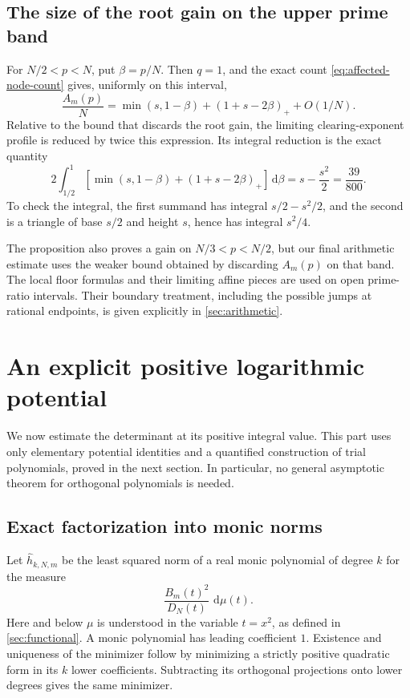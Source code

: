 \documentclass[11pt,letterpaper]{article}
\theoremstyle{definition}
\newcommand{\dd}{\,\mathrm d}
\newcommand{\pos}[1]{\left(#1\right)_{+}}
\begin{document}
\subsection{The size of the root gain on the upper prime band}
For $N/2<p<N$, put $\beta=p/N$. Then $q=1$, and the exact count
\eqref{eq:affected-node-count} gives, uniformly on this interval,
\begin{equation}\label{eq:affected-mass}
 \frac{A_m(p)}N
 =\min(s,1-\beta)+\pos{1+s-2\beta}+O(1/N).
\end{equation}
Relative to the bound that discards the root gain, the limiting
clearing-exponent profile is reduced by twice this expression.
Its integral reduction is the exact quantity
\begin{equation}\label{eq:integrated-root-gain}
 2\int_{1/2}^1
 \left[\min(s,1-\beta)+\pos{1+s-2\beta}\right]\dd\beta
 =s-\frac{s^2}{2}=\frac{39}{800}.
\end{equation}
To check the integral, the first summand has integral
$s/2-s^2/2$, and the second is a triangle of base $s/2$ and
height $s$, hence has integral $s^2/4$.

The proposition also proves a gain on $N/3<p<N/2$, but our final
arithmetic estimate uses the weaker bound obtained by discarding
$A_m(p)$ on that band. The local floor formulas and their limiting
affine pieces are used on open prime-ratio intervals. Their boundary
treatment, including the possible jumps at rational endpoints, is
given explicitly in \cref{sec:arithmetic}.


\section{An explicit positive logarithmic potential}\label{sec:potential}

We now estimate the determinant at its positive integral value. This part
uses only elementary potential identities and a quantified construction of
trial polynomials, proved in the next section. In particular, no general
asymptotic theorem for orthogonal polynomials is needed.

\subsection{Exact factorization into monic norms}
Let $\widehat h_{k,N,m}$ be the least squared norm of a real monic polynomial
of degree $k$ for the measure
\[
 \frac{B_m(t)^2}{D_N(t)}\,\dd\mu(t).
\]
Here and below $\mu$ is understood in the variable $t=x^2$, as defined in
\cref{sec:functional}. A monic polynomial has leading coefficient $1$.
Existence and uniqueness of the minimizer follow by minimizing a strictly
positive quadratic form in its $k$ lower coefficients. Subtracting its
orthogonal projections onto lower degrees gives the same minimizer.
\end{document}

